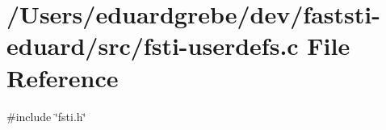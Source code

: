 \hypertarget{fsti-userdefs_8c}{}\section{/\+Users/eduardgrebe/dev/faststi-\/eduard/src/fsti-\/userdefs.c File Reference}
\label{fsti-userdefs_8c}
{\ttfamily \#include \char`\"{}fsti.\+h\char`\"{}}\newline
